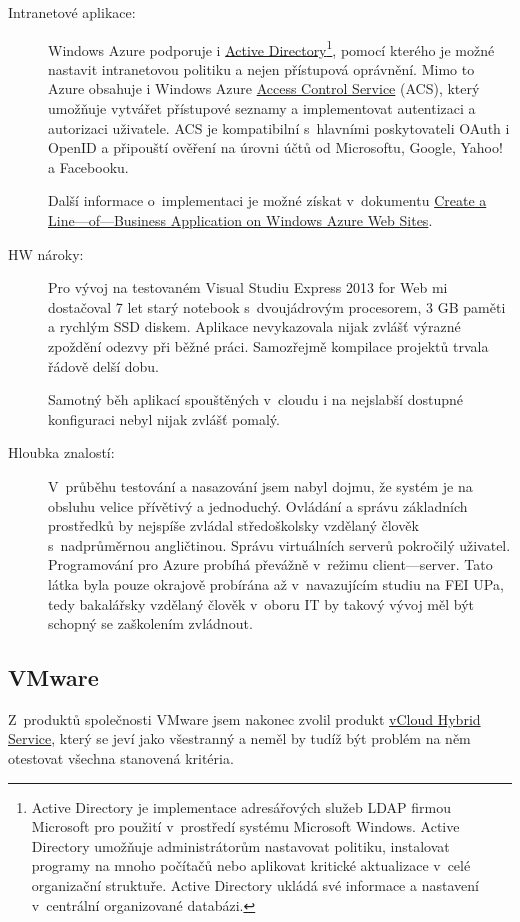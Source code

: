 \begin{description}
	\item [Intranetové aplikace:] Windows Azure podporuje i \href{http://cs.wikipedia.org/w/index.php?title=Active_Directory&oldid=11171033}{Active Directory}\footnote{Active Directory je implementace adresářových služeb LDAP firmou Microsoft pro použití v~prostředí systému Microsoft Windows. Active Directory umožňuje administrátorům nastavovat politiku, instalovat programy na mnoho počítačů nebo aplikovat kritické aktualizace v~celé organizační struktuře. Active Directory ukládá své informace a nastavení v~centrální organizované databázi.\cite{wiki:activeDirectory}}, pomocí kterého je možné nastavit intranetovou politiku a nejen přístupová oprávnění. Mimo to Azure obsahuje i Windows Azure \href{http://msdn.microsoft.com/library/windowsazure/hh147631.aspx}{Access Control Service} (ACS), který umožňuje vytvářet přístupové seznamy a implementovat autentizaci a autorizaci uživatele. ACS je kompatibilní s~hlavními poskytovateli OAuth i OpenID a připouští ověření na úrovni účtů od Microsoftu, Google, Yahoo! a Facebooku.\cite{azure:acs}

	Další informace o~implementaci je možné získat v~dokumentu \href{http://www.windowsazure.com/en-us/documentation/articles/web-sites-business-application-solution-overview/}{Create a Line---of---Business Application on Windows Azure Web Sites}\cite{azure:secureApps}.
	\item [HW nároky:] Pro vývoj na testovaném Visual Studiu Express 2013 for Web mi dostačoval 7 let starý notebook s~dvoujádrovým procesorem, 3 GB paměti a rychlým SSD diskem. Aplikace nevykazovala nijak zvlášť výrazné zpoždění odezvy při běžné práci. Samozřejmě kompilace projektů trvala řádově delší dobu.

Samotný běh aplikací spouštěných v~cloudu i na nejslabší dostupné konfiguraci nebyl nijak zvlášť pomalý.
	\item [Hloubka znalostí:] V~průběhu testování a nasazování jsem nabyl dojmu, že systém je na obsluhu velice přívětivý a jednoduchý. Ovládání a správu základních prostředků by nejspíše zvládal středoškolsky vzdělaný člověk s~nadprůměrnou angličtinou. Správu virtuálních serverů pokročilý uživatel. Programování pro Azure probíhá převážně v~režimu client---server. Tato látka byla pouze okrajově probírána až v~navazujícím studiu na FEI UPa, tedy bakalářsky vzdělaný člověk v~oboru IT by takový vývoj měl být schopný se zaškolením zvládnout.
\end{description}

\subsection{VMware}
Z~produktů společnosti VMware jsem nakonec zvolil produkt \href{http://vcloud.vmware.com/}{vCloud Hybrid Service}, který se jeví jako všestranný a neměl by tudíž být problém na něm otestovat všechna stanovená kritéria.

